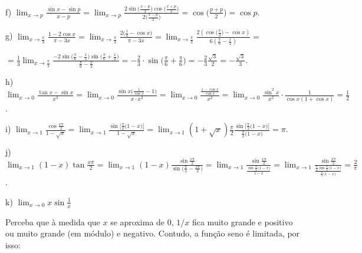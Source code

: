 \documentclass{article}
\begin{document}
{\begin{newpage}
f) $\displaystyle{\lim_{x\to p} \frac{\sin{x} - \sin{p}}{x-p} = \lim_{x\to p} \frac{2\sin{\Big(\frac{x-p}{2}\Big)}\cos{\Big(\frac{x+p}{2}\Big)}}{2\Big(\frac{x-p}{2}\Big)} = \cos{\Big(\frac{p+p}{2}\Big)} = \cos{p}}$.
\par
\vspace{0.3cm}
g) $\displaystyle{\lim_{x\to \frac{\pi }{3}} \frac{1 - 2\cos{x}}{\pi - 3x} =  \lim_{x\to \frac{\pi }{3}} \frac{2\Big(\frac{1}{2} - \cos{x}\Big)}{\pi - 3x} =  \lim_{x\to \frac{\pi }{3}} \frac{2(\cos{\Big(\frac{\pi }{3}\Big)} - \cos{x})}{6(\frac{\pi }{6} - \frac{x}{2})} =}$\par$\displaystyle{=\frac{1}{3}\lim_{x\to \frac{\pi }{3}} \frac{-2 \sin{\Big(\frac{\pi }{6} - \frac{x}{2}\Big)} \sin{\Big(\frac{\pi }{6} + \frac{x}{2}\Big)}}{\frac{\pi }{6} - \frac{x}{2}} = -\frac{2}{3}\cdot \sin{\Big(\frac{\pi }{6} + \frac{\pi }{6}\Big)} = -\frac{2}{3}\frac{\sqrt{3}}{2} = -\frac{\sqrt{3}}{3}}$.
\par
\vspace{0.3cm}
h) $\displaystyle{\lim_{x\to 0} \frac{\tan{x} - \sin{x}}{x^3} = \lim_{x\to 0} \frac{\sin{x}\Big(\frac{1}{\cos{x}} - 1\Big)}{x\cdot x^2} = \lim_{x\to 0} \frac{\frac{1-\cos{x}}{\cos{x}}}{x^2} = \lim_{x\to 0} \frac{\sin^2{x}}{x^2}\cdot\frac{1}{\cos{x}(1+\cos{x})} = \frac{1}{2}}$.
\par
\vspace{0.3cm}
i) $\displaystyle{\lim_{x\to 1} \frac{\cos{\frac{x\pi }{2}}}{1 - \sqrt{x}} = \lim_{x\to 1} \frac{\sin{\Big[\frac{\pi }{2}\Big(1-x\Big)\Big]}}{1-\sqrt{x}} = \lim_{x\to 1} (1+\sqrt{x})\frac{\pi }{2} \frac{\sin{\Big[\frac{\pi }{2}\Big(1-x\Big)\Big]}}{\frac{\pi }{2}\Big(1-x\Big)} = \pi}$.
\par
\vspace{0.3cm}
j) $\displaystyle{\lim_{x\to 1} (1-x)\tan{\frac{x\pi }{2}} = \lim_{x\to 1} (1-x)\frac{\sin{\frac{x\pi }{2}}}{\sin\Big({\frac{\pi }{2} - \frac{x\pi }{2}}\Big)} = \lim_{x\to 1} \frac{\sin{\frac{x\pi }{2}}}{\frac{\sin{\frac{\pi }{2}\Big(1-x\Big)}}{1-x}} = \lim_{x\to 1} \frac{\sin{\frac{x\pi }{2}}}{\frac{\frac{\pi }{2}\sin{\frac{\pi }{2}\Big(1-x\Big)}}{\frac{\pi }{2}\Big(1-x\Big)}} = \frac{2}{\pi }}$.
\par
\vspace{0.3cm}
k) $\displaystyle{\lim_{x\to 0}} x\sin{\frac{1}{x}}$
\par
\vspace{0.3cm} Perceba que à medida que $x$ se aproxima de 0, $1/x$ fica muito grande e positivo ou muito grande (em módulo) e negativo. Contudo, a função seno é limitada, por isso:

\end{newpage}}
\end{document}
